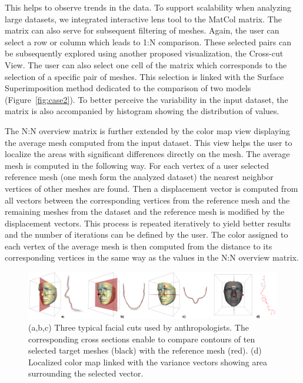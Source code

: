 \documentclass[final,5p,times]{elsarticle}
\begin{document}
This helps to observe trends in the data.
To support scalability when analyzing large datasets, we integrated interactive lens tool to the MatCol matrix.
The matrix can also serve for subsequent filtering of meshes.
Again, the user can select a row or column which leads to 1:N comparison.
These selected pairs can be subsequently explored using another proposed visualization, the Cross-cut View.
The user can also select one cell of the matrix which corresponds to the selection of a specific pair of meshes.
This selection is linked with the Surface Superimposition method dedicated to the comparison of two models (Figure~\ref{fig:case2}).
To better perceive the variability in the input dataset, the matrix is also accompanied by histogram showing the distribution of values.

The N:N overview matrix is further extended by the color map view displaying the average mesh computed from the input dataset. 
This view helps the user to localize the areas with significant differences directly on the mesh.
The average mesh is computed in the following way.
For each vertex of a user selected reference mesh (one mesh form the analyzed dataset) the nearest neighbor vertices of other meshes are found.
Then a displacement vector is computed from all vectors between the corresponding vertices from the reference mesh and the remaining meshes from the dataset and the reference mesh is modified by the displacement vectors.
This process is repeated iteratively to yield better results and the number of iterations can be defined by the user.
The color assigned to each vertex of the average mesh is then computed from the distance to its corresponding vertices in the same way as the values in the N:N overview matrix.

\begin{figure}[htb]
	\centering
  \includegraphics[width=1.0\linewidth]{pictures/cross.png}
  \caption{\label{fig:cross} (a,b,c) Three typical facial cuts used by anthropologists. The corresponding cross sections enable to compare contours of ten selected target meshes (black) with the reference mesh (red). (d) Localized color map linked with the variance vectors showing area surrounding the selected vector.}
\end{figure}
\end{document}
